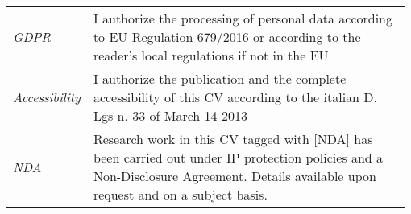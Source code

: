 \documentclass{ExpressiveResume}
\begin{document}
\noindent\begin{tabular}{@{} >{\raggedleft}p{0.1\linewidth}
 p{0.875\linewidth}}
 
\textit{GDPR} & I authorize the processing of personal data according to EU Regulation 679/2016 or according to the reader's local regulations if not in the EU \\
\textit{Accessibility} & I authorize the publication and the complete accessibility of this CV according to the italian D. Lgs n. 33 of March 14 2013 \\
\textit{NDA} & Research work in this CV tagged with [NDA] has been carried out under IP protection policies and a Non-Disclosure Agreement. Details available upon request and on a subject basis. \\
\end{tabular}
\end{document}
